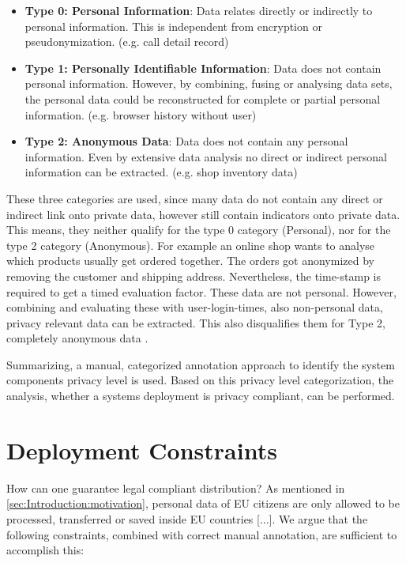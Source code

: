 \begin{itemize}
	\item \textbf{Type 0: Personal Information}: Data relates directly or indirectly to personal information. This is independent from encryption or pseudonymization. (e.g. call detail record)
	
	\item \textbf{Type 1: Personally Identifiable Information}:  Data does not contain personal information. However, by combining, fusing or analysing data sets, the personal data could be reconstructed for complete or partial personal information. (e.g. browser history without user)
	
	\item \textbf{Type 2: Anonymous Data}: Data does not contain any personal information. Even by extensive data analysis no direct or indirect personal information can be extracted. (e.g. shop inventory data)
	
	\label{sec:PrivacyConcept:dataprivacylevel}
\end{itemize}

These three categories are used, since many data do not contain any direct or indirect link onto private data, however still contain indicators onto private data. This means, they neither qualify for the type 0 category (Personal), nor for the type 2 category (Anonymous). For example an online shop wants to analyse which products usually get ordered together. The orders got anonymized by removing the customer and shipping address. Nevertheless, the time-stamp is required to get a timed evaluation factor. These data are not personal. However, combining and evaluating these with user-login-times, also non-personal data, privacy relevant data can be extracted. This also disqualifies them for Type 2, completely anonymous data \cite{Schmieders.}\cite{Schmieders.2015}.

Summarizing, a manual, categorized annotation approach to identify the system components privacy level is used. Based on this privacy level categorization, the analysis, whether a systems deployment is privacy compliant, can be performed.


\section{Deployment Constraints}
\label{sec:PrivacyConcept:deploymentrules}

How can one guarantee legal compliant distribution? As mentioned in \autoref{sec:Introduction:motivation}, personal data of EU citizens are only allowed to be processed, transferred or saved inside EU countries [...]. We argue that the following constraints, combined with correct manual annotation, are sufficient to accomplish this:

